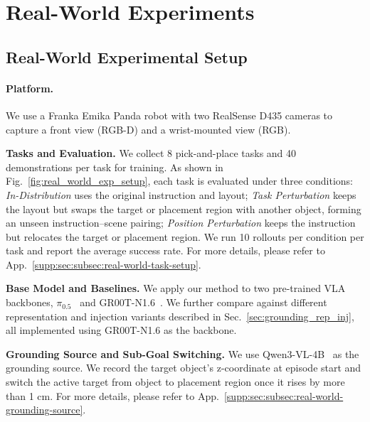 \section{Real-World Experiments}
\subsection{Real-World Experimental Setup}

\paragraph{Platform.} We use a Franka Emika Panda robot with two RealSense D435 cameras to  capture a front view (RGB-D) and a wrist-mounted view (RGB).

\noindent\textbf{Tasks and Evaluation.} We collect 8 pick-and-place tasks and 40 demonstrations per task for training. As shown in Fig.~\ref{fig:real_world_exp_setup}, each task is evaluated under three conditions: \textit{In-Distribution} uses the original instruction and layout; \textit{Task Perturbation} keeps the layout but swaps the target or placement region with another object, forming an unseen instruction–scene pairing; \textit{Position Perturbation} keeps the instruction but relocates the target or placement region. We run 10 rollouts per condition per task and report the average success rate. For more details, please refer to App.~\ref{supp:sec:subsec:real-world-task-setup}.

\noindent\textbf{Base Model and Baselines.} We apply our method to two pre-trained VLA backbones, $\pi_{0.5}$~\cite{pi05} and GR00T-N1.6~\cite{gr00tn1_2025}. We further compare against different representation and injection variants described in Sec.~\ref{sec:grounding_rep_inj}, all implemented using GR00T-N1.6 as the backbone.


\noindent\textbf{Grounding Source and Sub-Goal Switching.} We use Qwen3-VL-4B~\cite{qwen3vl} as the grounding source. We record the target object's z-coordinate at episode start and switch the active target from object to placement region once it rises by more than 1 cm. For more details, please refer to App.~\ref{supp:sec:subsec:real-world-grounding-source}.

